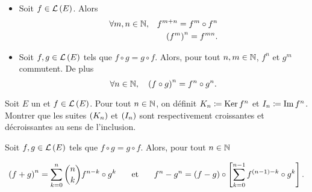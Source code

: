\documentclass{magnoliaold}
\begin{document}
\begin{proposition}
\begin{itemize}
\item Soit $f\in\mathcal{L}\left(E\right)$. Alors
\begin{eqnarray*}
\forall m,n\in\mathbb{N}, & & f^{m+n}=f^m\circ f^n\\
                 & & \left(f^m\right)^n=f^{mn}.
\end{eqnarray*}
\item Soit $f,g\in \mathcal{L}\left(E\right)$ tels que $f\circ g=g\circ f$. Alors, pour tout $n,m\in\mathbb{N}$, $f^n$ et $g^m$ commutent. De plus
\[\forall n\in\mathbb{N} ,\quad \left(f\circ g\right)^n=f^n \circ g^n.\]
\end{itemize}
\end{proposition}

\begin{exoUnique}
  \exo Soit $E$ un \Kev et $f\in\mathcal{L}\left(E\right)$. Pour tout $n\in\mathbb{N}$, on définit
    $K_n\coloneqq\mathop{\rm Ker} f^n$ et $I_n\coloneqq\operatorname{Im} f^n$. Montrer que les suites $\left(K_n\right)$ et
    $\left(I_n\right)$ sont respectivement croissantes et décroissantes au sens de
    l'inclusion.
  \end{exoUnique}

\begin{proposition}
  Soit $f,g\in\mathcal{L}\left(E\right)$ tels que $f\circ g=g\circ f$.
  Alors, pour tout $n\in\mathbb{N}$

    \[\left(f+g\right)^n = \sum_{k=0}^n \binom{n}{k} f^{n-k} \circ g^k \quad\quad\!\text{et}\quad\!\quad
      f^n-g^n=\left(f-g\right)\circ\left[\sum_{k=0}^{n-1} f^{\left(n-1\right)-k}\circ g^k\right].\]
  \end{proposition}







\end{document}
